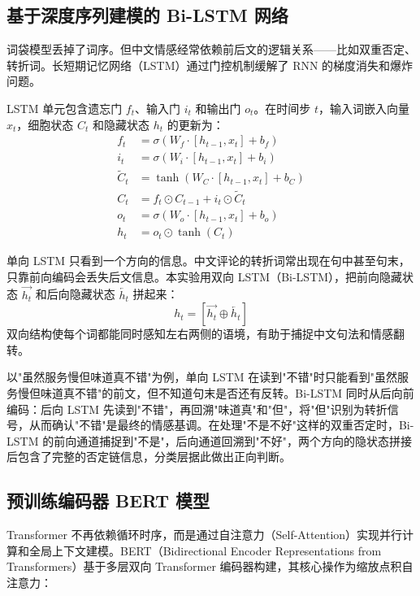 \subsection{基于深度序列建模的 Bi-LSTM 网络}
词袋模型丢掉了词序。但中文情感经常依赖前后文的逻辑关系——比如双重否定、转折词。长短期记忆网络（LSTM）通过门控机制缓解了 RNN 的梯度消失和爆炸问题。

LSTM 单元包含遗忘门 $f_t$、输入门 $i_t$ 和输出门 $o_t$。在时间步 $t$，输入词嵌入向量 $x_t$，细胞状态 $C_t$ 和隐藏状态 $h_t$ 的更新为：
\begin{align}
	f_t &= \sigma(W_f \cdot [h_{t-1}, x_t] + b_f) \label{eq:lstm_forget} \\
	i_t &= \sigma(W_i \cdot [h_{t-1}, x_t] + b_i) \label{eq:lstm_input} \\
	\tilde{C}_t &= \tanh(W_C \cdot [h_{t-1}, x_t] + b_C) \label{eq:lstm_candidate} \\
	C_t &= f_t \odot C_{t-1} + i_t \odot \tilde{C}_t \label{eq:lstm_cell} \\
	o_t &= \sigma(W_o \cdot [h_{t-1}, x_t] + b_o) \label{eq:lstm_output} \\
	h_t &= o_t \odot \tanh(C_t) \label{eq:lstm_hidden}
\end{align}

单向 LSTM 只看到一个方向的信息。中文评论的转折词常出现在句中甚至句末，只靠前向编码会丢失后文信息。本实验用双向 LSTM（Bi-LSTM），把前向隐藏状态 $\overrightarrow{h_t}$ 和后向隐藏状态 $\overleftarrow{h_t}$ 拼起来：
\begin{equation}
	h_t = [\overrightarrow{h_t} \oplus \overleftarrow{h_t}]
\end{equation}
双向结构使每个词都能同时感知左右两侧的语境，有助于捕捉中文句法和情感翻转。

以"虽然服务慢但味道真不错"为例，单向 LSTM 在读到"不错"时只能看到"虽然服务慢但味道真不错"的前文，但不知道句末是否还有反转。Bi-LSTM 同时从后向前编码：后向 LSTM 先读到"不错"，再回溯"味道真"和"但"，将"但"识别为转折信号，从而确认"不错"是最终的情感基调。在处理"不是不好"这样的双重否定时，Bi-LSTM 的前向通道捕捉到"不是"，后向通道回溯到"不好"，两个方向的隐状态拼接后包含了完整的否定链信息，分类层据此做出正向判断。

\subsection{预训练编码器 BERT 模型}
Transformer 不再依赖循环时序，而是通过自注意力（Self-Attention）实现并行计算和全局上下文建模。BERT（Bidirectional Encoder Representations from Transformers）基于多层双向 Transformer 编码器构建，其核心操作为缩放点积自注意力：

